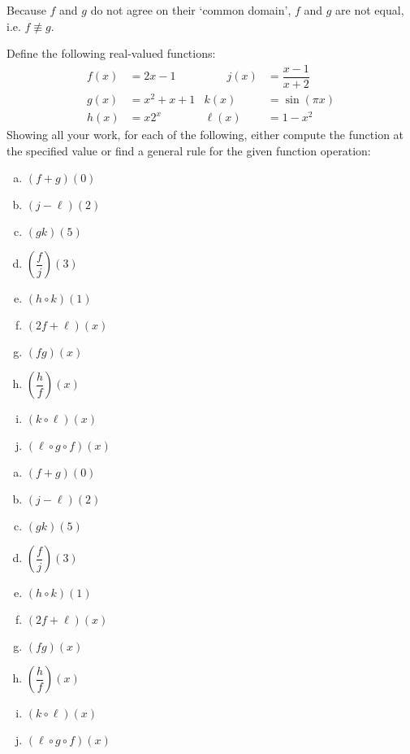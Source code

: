 \documentclass[11pt,letterpaper]{article}
\begin{document}
Because $f$ and $g$ do not agree on their `common domain', $f$ and $g$ are not equal, i.e. $f \not\equiv g$. 



\newpage



 Define the following real-valued functions:
	\[
	\begin{aligned}
	f(x)&= 2x - 1 &\qquad j(x)&= \dfrac{x - 1}{x + 2} \\
	g(x)&= x^2 + x + 1 & k(x)&= \sin(\pi x) \\
	h(x)&= x 2^x & \ell(x)&= 1 - x^2
	\end{aligned}
	\]
Showing all your work, for each of the following, either compute the function at the specified value or find a general rule for the given function operation:
	\begin{enumerate}[(a)]
	\item $(f + g)(0)$
	\item $(j - \ell)(2)$
	\item $(gk)(5)$
	\item $\left( \dfrac{f}{j} \right) (3)$
	\item $(h \circ k)(1)$
	\item $(2f + \ell)(x)$
	\item $(fg)(x)$
	\item $\left( \dfrac{h}{f} \right)(x)$
	\item $(k \circ \ell)(x)$
	\item $(\ell \circ g \circ f)(x)$
	\end{enumerate} \pspace

\sol

\begin{enumerate}[(a)]
\item $(f + g)(0)$
\item $(j - \ell)(2)$
\item $(gk)(5)$
\item $\left( \dfrac{f}{j} \right) (3)$
\item $(h \circ k)(1)$
\item $(2f + \ell)(x)$
\item $(fg)(x)$
\item $\left( \dfrac{h}{f} \right)(x)$
\item $(k \circ \ell)(x)$
\item $(\ell \circ g \circ f)(x)$
\end{enumerate}



\newpage
\end{document}
